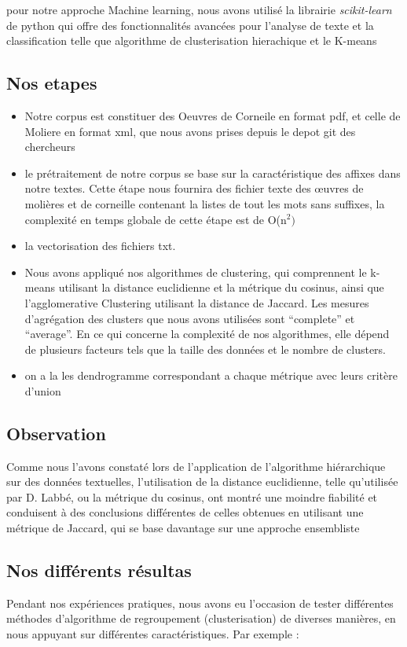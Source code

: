 \documentclass[]{report}
\begin{document}
pour notre approche Machine learning, nous avons utilisé la librairie
\textit{scikit-learn} de python qui offre des fonctionnalités avancées pour
l'analyse de texte et la classification telle que algorithme de clusterisation
hierachique et le K-means 
\subsection{Nos etapes } 

\begin{itemize}
\item Notre corpus est constituer des Oeuvres de Corneile en format pdf, et
celle de Moliere  en format xml, que nous avons prises depuis le depot git des
chercheurs 
\item le prétraitement de notre corpus se base sur la caractéristique des
affixes dans notre textes. Cette étape nous fournira des fichier texte des
œuvres de molières et de corneille contenant la listes de tout les mots sans
suffixes, la complexité en temps globale de cette étape est de O(n\(^2)\)
\item la vectorisation des fichiers txt.
\item Nous avons appliqué nos algorithmes de clustering, qui comprennent le
k-means utilisant la distance euclidienne et la métrique du cosinus, ainsi que
l'agglomerative Clustering utilisant la distance de Jaccard. Les mesures
d'agrégation des clusters que nous avons utilisées sont ``complete'' et
``average''. En ce qui concerne la complexité de nos algorithmes, elle dépend de
plusieurs facteurs tels que la taille des données et le nombre de clusters. 
\item  on a la les dendrogramme correspondant a chaque métrique avec leurs
critère d'union
\end{itemize}

\subsection{Observation}
Comme nous l'avons constaté lors de l'application de l'algorithme hiérarchique
sur des données textuelles, l'utilisation de la distance euclidienne, telle
qu'utilisée par D. Labbé, ou la métrique du cosinus, ont montré une moindre
fiabilité et conduisent à des conclusions différentes de celles obtenues en
utilisant une métrique de Jaccard, qui se base davantage sur une approche
ensembliste 

\subsection{Nos différents résultas}
Pendant nos expériences pratiques, nous avons eu l'occasion de tester
différentes méthodes d'algorithme de regroupement (clusterisation) de diverses
manières, en nous appuyant sur différentes caractéristiques. Par exemple :
\end{document}
